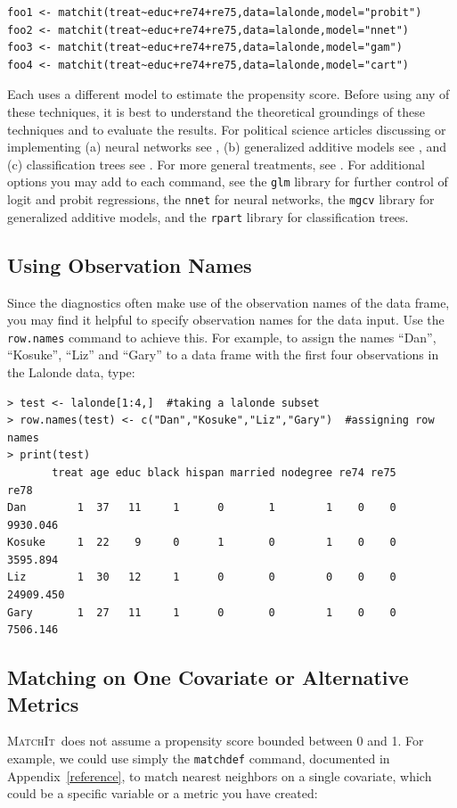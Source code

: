 \documentclass[oneside,letterpaper,titlepage]{article}
\newcommand{\MatchIt}{\textsc{MatchIt}}
\begin{document}
\begin{verbatim}
foo1 <- matchit(treat~educ+re74+re75,data=lalonde,model="probit")
foo2 <- matchit(treat~educ+re74+re75,data=lalonde,model="nnet")
foo3 <- matchit(treat~educ+re74+re75,data=lalonde,model="gam")
foo4 <- matchit(treat~educ+re74+re75,data=lalonde,model="cart")
\end{verbatim}

Each uses a different model to estimate the propensity score.  Before
using any of these techniques, it is best to understand the
theoretical groundings of these techniques and to evaluate the
results.  For political science articles discussing or implementing
(a) neural networks see
\citet{BecKinZen00,Zeng99,Zeng00,KinZen02,LagRus02}, (b) generalized
additive models see \citet{BecJac98}, and (c) classification trees see
\citet{RugKimMar03}.  For more general treatments, see
\citet{Bishop95,White92,BreFriOls84}.  For additional options you may
add to each command, see the \texttt{glm} library for further control
of logit and probit regressions, the \texttt{nnet} for neural
networks, the \texttt{mgcv} library for generalized additive models,
and the \texttt{rpart} library for classification trees.

\subsection{Using Observation Names}
\label{rnames}

Since the diagnostics often make use of the observation names of the
data frame, you may find it helpful to specify observation names for
the data input.  Use the \texttt{row.names} command to achieve this.
For example, to assign the names ``Dan'', ``Kosuke'', ``Liz'' and
``Gary'' to a data frame with the first four observations in the
Lalonde data, type:

\begin{verbatim}
> test <- lalonde[1:4,]  #taking a lalonde subset
> row.names(test) <- c("Dan","Kosuke","Liz","Gary")  #assigning row names
> print(test)
       treat age educ black hispan married nodegree re74 re75      re78
Dan        1  37   11     1      0       1        1    0    0  9930.046
Kosuke     1  22    9     0      1       0        1    0    0  3595.894
Liz        1  30   12     1      0       0        0    0    0 24909.450
Gary       1  27   11     1      0       0        1    0    0  7506.146
\end{verbatim} 

\subsection{Matching on One Covariate or Alternative Metrics}
\MatchIt\ does not assume a propensity score bounded between 0 and 1.
For example, we could use simply the \texttt{matchdef} command,
documented in Appendix~\ref{reference}, to match nearest neighbors on
a single covariate, which could be a specific variable or a metric you
have created:
\end{document}
